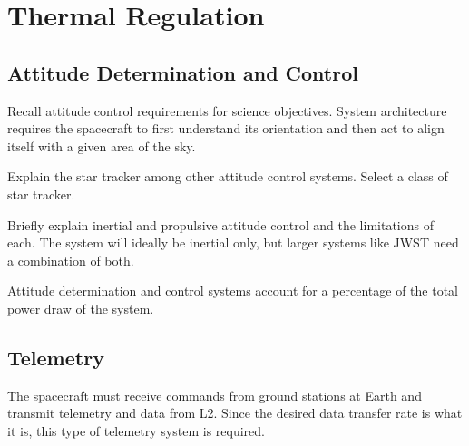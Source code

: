 \documentclass{ws-jai}
\begin{document}
\section{Thermal Regulation}
\label{sec:thermal}
%
%
%
%

\subsection{Attitude Determination and Control}
\label{subsec:adcs}
Recall attitude control requirements for science objectives.
System architecture requires the spacecraft to first understand its orientation and then act to align itself with a given area of the sky.

Explain the star tracker among other attitude control systems.
Select a class of star tracker.

Briefly explain inertial and propulsive attitude control and the limitations of each.
The system will ideally be inertial only, but larger systems like JWST need a combination of both.

Attitude determination and control systems account for a percentage of the total power draw of the system.

\subsection{Telemetry}
\label{subsec:telemetry}
The spacecraft must receive commands from ground stations at Earth and transmit telemetry and data from L2.
Since the desired data transfer rate is what it is, this type of telemetry system is required.
\end{document}
